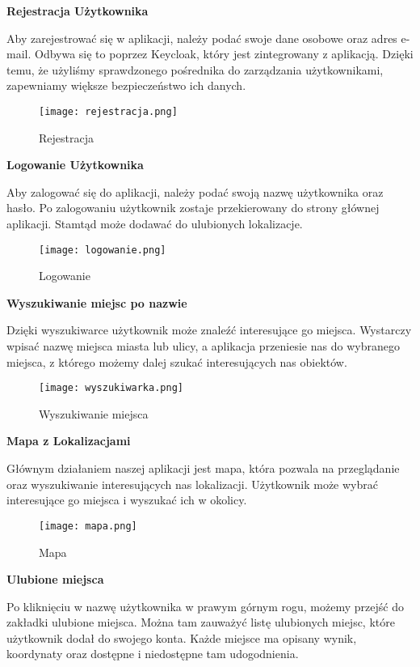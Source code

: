 \documentclass{article}
\begin{document}
\noindent\textbf{Rejestracja Użytkownika}

Aby zarejestrować się w aplikacji, należy podać swoje dane osobowe oraz adres e-mail. Odbywa się to poprzez Keycloak, który jest zintegrowany z aplikacją. Dzięki temu, że użyliśmy sprawdzonego pośrednika do zarządzania użytkownikami, zapewniamy większe bezpieczeństwo ich danych.

\begin{figure}[H]
    \centering
    \texttt{[image: rejestracja.png]}
    \caption{Rejestracja}
    \label{fig:rejestracja}
\end{figure}

\noindent\textbf{Logowanie Użytkownika}

Aby zalogować się do aplikacji, należy podać swoją nazwę użytkownika oraz hasło. Po zalogowaniu użytkownik zostaje przekierowany do strony głównej aplikacji. Stamtąd może dodawać do ulubionych lokalizacje.

\begin{figure}[H]
    \centering
    \texttt{[image: logowanie.png]}
    \caption{Logowanie}
    \label{fig:logowanie}
\end{figure}

\noindent\textbf{Wyszukiwanie miejsc po nazwie}

Dzięki wyszukiwarce użytkownik może znaleźć interesujące go miejsca. Wystarczy wpisać nazwę miejsca miasta lub ulicy, a aplikacja przeniesie nas do wybranego miejsca, z którego możemy dalej szukać interesujących nas obiektów.

\begin{figure}[H]
    \centering
    \texttt{[image: wyszukiwarka.png]}
    \caption{Wyszukiwanie miejsca}
    \label{fig:wyszukiwanie}
\end{figure}

\noindent\textbf{Mapa z Lokalizacjami}

Głównym działaniem naszej aplikacji jest mapa, która pozwala na przeglądanie oraz wyszukiwanie interesujących nas lokalizacji. Użytkownik może wybrać interesujące go miejsca i wyszukać ich w okolicy.

\begin{figure}[H]
    \centering
    \texttt{[image: mapa.png]}
    \caption{Mapa}
    \label{fig:mapa}
\end{figure}

\noindent\textbf{Ulubione miejsca}

Po kliknięciu w nazwę użytkownika w prawym górnym rogu, możemy przejść do zakładki ulubione miejsca. Można tam zauważyć listę ulubionych miejsc, które użytkownik dodał do swojego konta. Każde miejsce ma opisany wynik, koordynaty oraz dostępne i niedostępne tam udogodnienia.
\end{document}
